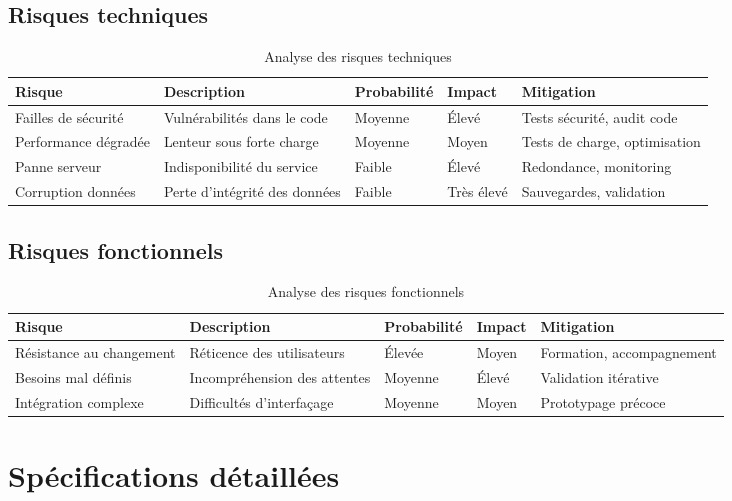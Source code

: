 \subsection{Risques techniques}

\begin{table}[H]
\centering
\caption{Analyse des risques techniques}
\begin{tabular}{|p{3cm}|p{3cm}|p{2cm}|p{4cm}|p{3cm}|}
\hline
\textbf{Risque} & \textbf{Description} & \textbf{Probabilité} & \textbf{Impact} & \textbf{Mitigation} \\
\hline
Failles de sécurité & Vulnérabilités dans le code & Moyenne & Élevé & Tests sécurité, audit code \\
Performance dégradée & Lenteur sous forte charge & Moyenne & Moyen & Tests de charge, optimisation \\
Panne serveur & Indisponibilité du service & Faible & Élevé & Redondance, monitoring \\
Corruption données & Perte d'intégrité des données & Faible & Très élevé & Sauvegardes, validation \\
\hline
\end{tabular}
\end{table}

\subsection{Risques fonctionnels}

\begin{table}[H]
\centering
\caption{Analyse des risques fonctionnels}
\begin{tabular}{|p{3cm}|p{3cm}|p{2cm}|p{4cm}|p{3cm}|}
\hline
\textbf{Risque} & \textbf{Description} & \textbf{Probabilité} & \textbf{Impact} & \textbf{Mitigation} \\
\hline
Résistance au changement & Réticence des utilisateurs & Élevée & Moyen & Formation, accompagnement \\
Besoins mal définis & Incompréhension des attentes & Moyenne & Élevé & Validation itérative \\
Intégration complexe & Difficultés d'interfaçage & Moyenne & Moyen & Prototypage précoce \\
\hline
\end{tabular}
\end{table}

\section{Spécifications détaillées}

